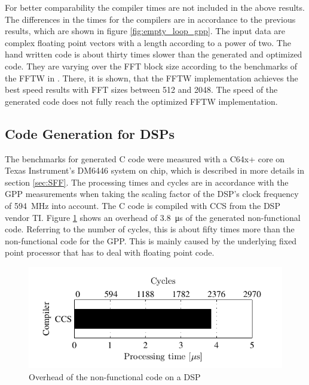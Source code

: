 For better comparability the compiler times are not included in the above results. The differences in the times for the compilers are in accordance to the previous results, which are shown in figure \ref{fig:empty_loop_gpp}. The input data are complex floating point vectors with a length according to a power of two. The hand written code is about thirty times slower than the generated and optimized code. They are varying over the FFT block size according to the benchmarks of the FFTW in \cite{fftw_bench}. There, it is shown, that the FFTW implementation achieves the best speed results with FFT sizes between 512 and 2048. The speed of the generated code does not fully reach the optimized FFTW implementation.



\subsection{Code Generation for DSPs}

The benchmarks for generated C code were measured with a C64x+ core on Texas Instrument's DM6446 system on chip, which is described in more details in section \ref{sec:SFF}. The processing times and cycles are in accordance with the GPP measurements when taking the scaling factor of the DSP's clock frequency of \SI{594}{MHz} into account. The C code is compiled with \ac{CCS} from the \ac{DSP} vendor \ac{TI}. Figure \ref{fig:empty_loop_dsp} shows an overhead of \SI{3.8}{\micro s} of the generated non-functional code. Referring to the number of cycles, this is about fifty times more than the non-functional code for the GPP. This is mainly caused by the underlying fixed point processor that has to deal with floating point code.

\begin{figure}[htbp]
	\centering
		\includegraphics{../kapitel02/figures/empty_loop_dsp.pdf}
	\caption{Overhead of the non-functional code on a DSP}
	\label{fig:empty_loop_dsp}
\end{figure}

